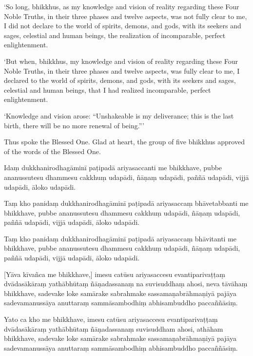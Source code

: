 ‘So long, bhikkhus, as my knowledge and vision of reality regarding
these Four Noble Truths, in their three phases and twelve aspects, was
not fully clear to me, I did not declare to the world of spirits,
demons, and gods, with its seekers and sages, celestial and human
beings, the realization of incomparable, perfect enlightenment.

‘But when, bhikkhus, my knowledge and vision of reality regarding these
Four Noble Truths, in their three phases and twelve aspects, was fully
clear to me, I declared to the world of spirits, demons, and gods, with
its seekers and sages, celestial and human beings, that I had realized
incomparable, perfect enlightenment.

‘Knowledge and vision arose: “Unshakeable is my deliverance; this is
the last birth, there will be no more renewal of being.”\thinspace ’

Thus spoke the Blessed One. Glad at heart, the group of five bhikkhus
approved of the words of the Blessed One.

\clearpage

\paliText
\markboth{\paliTitle}{\rightmark}

Idaṃ dukkhanirodhagāminī paṭipadā ariyasaccanti me bhikkhave, pubbe
ananussutesu dhammesu cakkhuṃ udapādi, ñāṇaṃ udapādi, paññā udapādi,
vijjā udapādi, āloko udapādi.

Taṃ kho panidaṃ dukkhanirodhagāminī paṭipadā ariyasaccaṃ bhāvetabbanti
me bhikkhave, pubbe ananussutesu dhammesu cakkhuṃ udapādi, ñāṇaṃ
udapādi, paññā udapādi, vijjā udapādi, āloko udapādi.

Taṃ kho panidaṃ dukkhanirodhagāminī paṭipadā ariyasaccaṃ bhāvitanti me
bhikkhave, pubbe ananussutesu dhammesu cakkhuṃ udapādi, ñāṇaṃ udapādi,
paññā udapādi, vijjā udapādi, āloko udapādi.

[Yāva kīvañca me bhikkhave,] imesu catūsu ariyasaccesu evantiparivaṭṭaṃ
dvādasākāraṃ yathābhūtaṃ ñāṇadassanaṃ na suvisuddhaṃ ahosi, neva tāvāhaṃ
bhikkhave, sadevake loke samārake sabrahmake sassamaṇabrāhmaṇiyā pajāya
sadevamanussāya anuttaraṃ sammāsambodhiṃ abhisambuddho paccaññāsiṃ.

Yato ca kho me bhikkhave, imesu catūsu ariyasaccesu evantiparivaṭṭaṃ
dvādasākāraṃ yathābhūtaṃ ñāṇadassanaṃ suvisuddham ahosi, athāham
bhikkhave, sadevake loke samārake sabrahmake sassamaṇabrāhmaṇiyā pajāya
sadevamanussāya anuttaraṃ sammāsambodhiṃ abhisambuddho paccaññāsiṃ.


